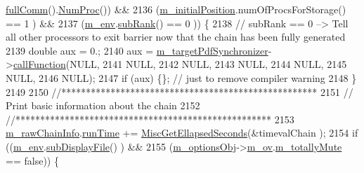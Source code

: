 \begin{DoxyCode}
{{{      \hyperlink{class_q_u_e_s_o_1_1_base_environment_a0b0779b41ff304058856e97e1d16b4d4}{fullComm}().\hyperlink{class_q_u_e_s_o_1_1_mpi_comm_aa780721ae0fdeabc5a15e04cb0cad964}{NumProc}()) &&
2136       (\hyperlink{class_q_u_e_s_o_1_1_metropolis_hastings_s_g_ae29f5d1198228858283d733021da2b14}{m\_initialPosition}.numOfProcsForStorage() == 1                         ) &&
2137       (\hyperlink{class_q_u_e_s_o_1_1_metropolis_hastings_s_g_ac8ea061e55b920e0c8f9bce5c3f20e52}{m\_env}.\hyperlink{class_q_u_e_s_o_1_1_base_environment_a172d52f993f1322ed45aaddf71518dbb}{subRank}()                          == 0                         )) \{
2138     \textcolor{comment}{// subRank == 0 --> Tell all other processors to exit barrier now that the chain has been fully
       generated}
2139     \textcolor{keywordtype}{double} aux = 0.;
2140     aux = \hyperlink{class_q_u_e_s_o_1_1_metropolis_hastings_s_g_ae7c7551764e0ccdfbe2862c544cdab10}{m\_targetPdfSynchronizer}->\hyperlink{class_q_u_e_s_o_1_1_scalar_function_synchronizer_adcdc70486ac64c11d0e505c4fb590a6b}{callFunction}(NULL,
2141                                                 NULL,
2142                                                 NULL,
2143                                                 NULL,
2144                                                 NULL,
2145                                                 NULL,
2146                                                 NULL);
2147     \textcolor{keywordflow}{if} (aux) \{\}; \textcolor{comment}{// just to remove compiler warning}
2148   \}
2149 
2150   \textcolor{comment}{//****************************************************}
2151   \textcolor{comment}{// Print basic information about the chain}
2152   \textcolor{comment}{//****************************************************}
2153   \hyperlink{class_q_u_e_s_o_1_1_metropolis_hastings_s_g_ac531509489028853bb17c0353fc9eafd}{m\_rawChainInfo}.\hyperlink{struct_q_u_e_s_o_1_1_m_h_raw_chain_info_struct_a5b36b9734f0b40d54cfd4c58c18c9b45}{runTime} += \hyperlink{namespace_q_u_e_s_o_a424bc33f2e6e287fd468408d14b772ee}{MiscGetEllapsedSeconds}(&timevalChain
      );
2154   \textcolor{keywordflow}{if} ((\hyperlink{class_q_u_e_s_o_1_1_metropolis_hastings_s_g_ac8ea061e55b920e0c8f9bce5c3f20e52}{m\_env}.\hyperlink{class_q_u_e_s_o_1_1_base_environment_a8a0064746ae8dddfece4229b9ad374d6}{subDisplayFile}()                   ) &&
2155       (\hyperlink{class_q_u_e_s_o_1_1_metropolis_hastings_s_g_a5d0bc9f73d50d272aa6bfb5ef5939ef3}{m\_optionsObj}->\hyperlink{class_q_u_e_s_o_1_1_metropolis_hastings_s_g_options_a9d4792d9fc2dc5439b8ab489b0c236eb}{m\_ov}.\hyperlink{class_q_u_e_s_o_1_1_mh_options_values_af812309e81191e88dfdc87c5815141a3}{m\_totallyMute} == \textcolor{keyword}{false})) \{
}}}
\end{DoxyCode}

